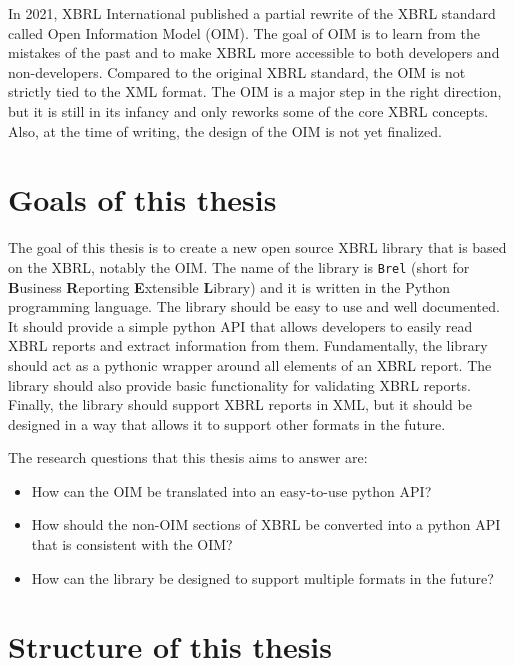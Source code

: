 In 2021, XBRL International published a partial rewrite of the XBRL standard called Open Information Model (OIM)\cite{oim}.
The goal of OIM is to learn from the mistakes of the past and to make XBRL more accessible to both developers and non-developers.
Compared to the original XBRL standard, the OIM is not strictly tied to the XML format.
The OIM is a major step in the right direction, but it is still in its infancy and only reworks some of the core XBRL concepts.
Also, at the time of writing, the design of the OIM is not yet finalized.

\section{Goals of this thesis}

The goal of this thesis is to create a new open source XBRL library that is based on the XBRL, notably the OIM.
The name of the library is \texttt{Brel} (short for \textbf{B}usiness \textbf{R}eporting \textbf{E}xtensible \textbf{L}ibrary) and it is written in the Python programming language.
The library should be easy to use and well documented.
It should provide a simple python API that allows developers to easily read XBRL reports and extract information from them.
Fundamentally, the library should act as a pythonic wrapper around all elements of an XBRL report.
The library should also provide basic functionality for validating XBRL reports.
Finally, the library should support XBRL reports in XML, but it should be designed in a way that allows it to support other formats in the future.

The research questions that this thesis aims to answer are:

\begin{itemize}
    \item How can the OIM be translated into an easy-to-use python API?\label{itm:research_question_1}
    \item How should the non-OIM sections of XBRL be converted into a python API that is consistent with the OIM?\label{itm:research_question_2}
    \item How can the library be designed to support multiple formats in the future?\label{itm:research_question_3}
\end{itemize}

\section{Structure of this thesis}

